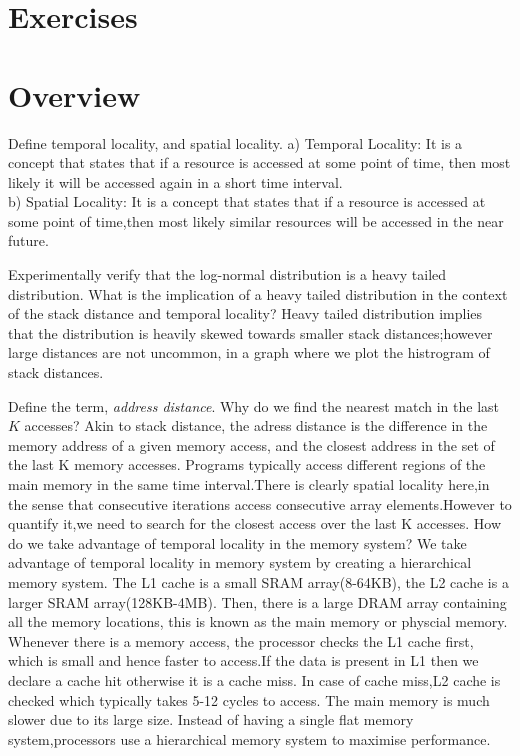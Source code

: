 \section*{Exercises}
\vskip 1cm

\setcounter{Exercise}{0}
\setcounter{Answer}{0}

\section*{Overview}

\begin{ExerciseList}

\Exercise
Define temporal locality, and spatial locality.
\Answer
a) Temporal Locality:
It is a concept that states that if a resource is accessed at some point of time, then most likely it will be accessed again in a short time interval.\\
b) Spatial Locality:
It is a concept that states that if a resource is accessed at some point of time,then most likely similar resources will be accessed in the near future.

\Exercise
Experimentally verify that the log-normal distribution is a heavy tailed
distribution. What is the implication of a heavy tailed distribution in the context of
the stack distance and temporal locality?
\Answer
Heavy tailed distribution implies that the distribution is heavily skewed towards smaller stack distances;however large distances are not uncommon, in a graph where we plot the histrogram of stack distances.

\Exercise
Define the term, {\em address distance}. Why do we find the nearest match in the
last $K$ accesses?
\Answer
Akin to stack distance, the adress distance is the difference in the memory address of a given memory access, and the closest address in the set of the last K memory accesses.
Programs typically access different regions of the main memory in the same time interval.There is clearly spatial locality here,in the sense that consecutive iterations access consecutive array elements.However to quantify it,we need to search for the closest access over the last K accesses.
\Exercise How do we take advantage of temporal locality in the memory system?
\Answer
We take advantage of temporal locality in memory system by creating a hierarchical memory system.
The L1 cache is a small SRAM array(8-64KB), the L2 cache is a larger SRAM array(128KB-4MB). Then, there is a large DRAM array containing all the memory locations, this is known as the main memory or physcial memory. Whenever there is a memory access, the processor checks the L1 cache first, which is small and hence faster to access.If the data is present in L1 then we declare a cache hit otherwise it is a cache miss. In case of cache miss,L2 cache is checked which typically takes 5-12 cycles to access. The main memory is much slower due to its large size.
Instead of having a single flat memory system,processors use a hierarchical memory system to maximise performance.


\end{ExerciseList}
